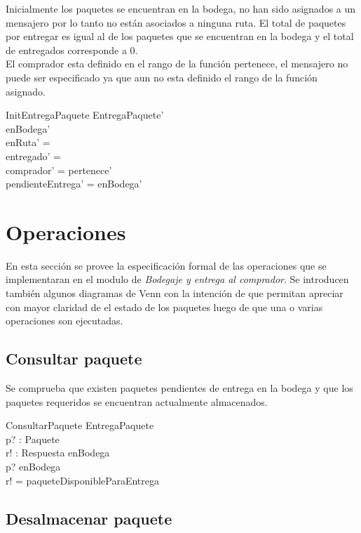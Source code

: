 \documentclass[12pt,a4paper]{article}
\begin{document}
Inicialmente los paquetes se encuentran en la bodega, no han sido asignados a un mensajero por lo tanto no están asociados a ninguna ruta. El total de paquetes por entregar es igual al de los paquetes que se encuentran en la bodega y el total de entregados corresponde a 0.\\
El comprador esta definido en el rango de la función pertenece, el mensajero no puede ser especificado ya que aun no esta definido el rango de la función asignado.

\begin{schema}{InitEntregaPaquete}
EntregaPaquete'\\
\where
enBodega' \neq \emptyset\\
enRuta' = \emptyset\\
entregado' = \emptyset\\
comprador' = \ran pertenece'\\
pendienteEntrega' = enBodega'
\end{schema}

\section{Operaciones}

En esta sección se provee la especificación formal de las operaciones que se implementaran en el modulo de \textit{Bodegaje y entrega al comprador}. Se introducen también algunos diagramas de Venn con la intención de que permitan apreciar con mayor claridad de el estado de los paquetes luego de que una o varias operaciones son ejecutadas.

\subsection{Consultar paquete}

Se comprueba que existen paquetes pendientes de entrega en la bodega y que los paquetes requeridos se encuentran actualmente almacenados.

\begin{schema}{ConsultarPaquete}
\Xi EntregaPaquete\\
p? : Paquete\\
r! : Respuesta
\where
enBodega \neq \emptyset\\
p? \in enBodega\\
r! = paqueteDisponibleParaEntrega
\end{schema}

\subsection{Desalmacenar paquete}
\end{document}
